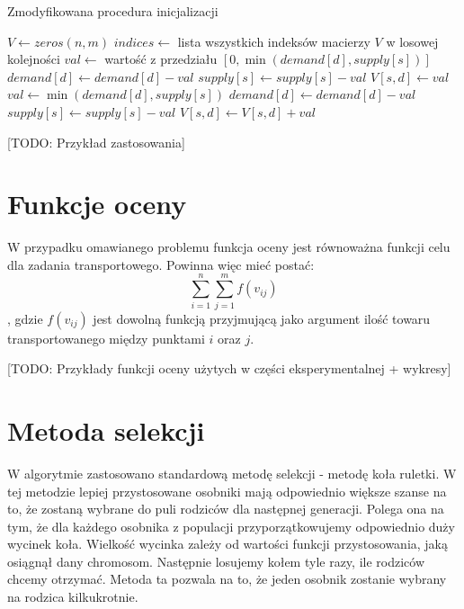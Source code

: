 \begin{pseudokod}[H]
    \label{inicjalizacja-2}
    \caption{Zmodyfikowana procedura inicjalizacji}
    \BlankLine
    $V \gets zeros(n, m)$
    $indices \gets$ lista wszystkich indeksów macierzy $V$ w losowej kolejności\;
    \BlankLine
     {
        $val \gets$ wartość z przedziału $[0, \min(demand[d], supply[s])]$\;
        $demand[d] \gets demand[d] - val$\;
        $supply[s] \gets supply[s] - val$\;
        $V[s, d] \gets val$\;
    }
    \BlankLine
     {
        $val \gets \min(demand[d], supply[s])$\;
        $demand[d] \gets demand[d] - val$\;
        $supply[s] \gets supply[s] - val$\;
        $V[s, d] \gets V[s, d] + val$\;
    }

\end{pseudokod}

[TODO: Przykład zastosowania]

\section{Funkcje oceny}
W przypadku omawianego problemu funkcja oceny jest równoważna funkcji celu dla zadania transportowego. Powinna więc mieć postać:
$$\sum_{i=1}^{n}\sum_{j=1}^{m} f(v_{ij})$$, 
gdzie $f(v_{ij})$ jest dowolną funkcją przyjmującą jako argument ilość towaru transportowanego między punktami $i$ oraz $j$.

[TODO: Przykłady funkcji oceny użytych w części eksperymentalnej + wykresy]

\section{Metoda selekcji}
W algorytmie zastosowano standardową metodę selekcji - metodę koła ruletki. W tej metodzie lepiej przystosowane osobniki mają odpowiednio większe 
szanse na to, że zostaną wybrane do puli rodziców dla następnej generacji. Polega ona na tym, że dla każdego osobnika z populacji 
przyporzątkowujemy odpowiednio duży wycinek koła. Wielkość wycinka zależy od wartości funkcji przystosowania, jaką osiągnął dany chromosom. 
Następnie losujemy kołem tyle razy, ile rodziców chcemy otrzymać. Metoda ta pozwala na to, że jeden osobnik zostanie wybrany na rodzica kilkukrotnie.

